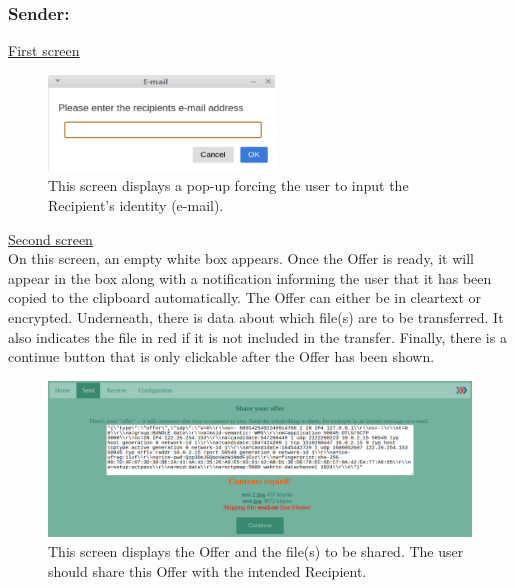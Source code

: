 
\subsubsection*{Sender:}
%
\noindent
\underline{First screen}
\begin{figure}[H]
  \centering
  \includegraphics[width=60mm]{Figures/SL/send_pop_up}
  \decoRule
  \caption[Serverless mode: Register recipient screen]{This screen displays a pop-up forcing the user to input the Recipient's identity (e-mail).}
  \label{fig:serv_s_pop}
\end{figure}

%
\noindent
\underline{Second screen}\\
On this screen, an empty white box appears. Once the Offer is ready, it will appear in the box along with a notification informing the user that it has been copied to the clipboard automatically. The Offer can either be in cleartext or encrypted. Underneath, there is data about which file(s) are to be transferred. It also indicates the file in red if it is not included in the transfer. Finally, there is a continue button that is only clickable after the Offer has been shown.
\begin{figure}[H]
  \centering
  \includegraphics[width=\textwidth]{Figures/SL/offer}
  \decoRule
  \caption[Serverless mode: Display Offer screen]{This screen displays the Offer and the file(s) to be shared. The user should share this Offer with the intended Recipient.}
  \label{fig:serv_s_off}
\end{figure}

